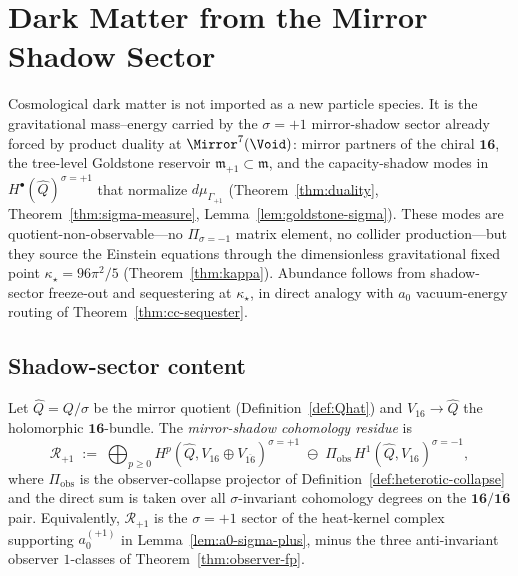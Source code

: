\section{Dark Matter from the Mirror Shadow Sector}
\label{sec:dark-sector}

Cosmological dark matter is not imported as a new particle species. It is the
gravitational mass--energy carried by the $\sigma=+1$ mirror-shadow sector
already forced by product duality at $\Mirror^7(\Void)$: mirror partners of the
chiral $\mathbf{16}$, the tree-level Goldstone reservoir
$\mathfrak{m}_{+1}\subset\mathfrak{m}$, and the capacity-shadow modes in
$H^\bullet(\hat Q)^{\sigma=+1}$ that normalize $d\mu_{\Gamma_{+1}}$
(Theorem~\ref{thm:duality}, Theorem~\ref{thm:sigma-measure},
Lemma~\ref{lem:goldstone-sigma}). These modes are quotient-non-observable---no
$\Pi_{\sigma=-1}$ matrix element, no collider production---but they source the
Einstein equations through the dimensionless gravitational fixed point
$\kappa_\star=96\pi^2/5$ (Theorem~\ref{thm:kappa}). Abundance follows from
shadow-sector freeze-out and sequestering at $\kappa_\star$, in direct analogy
with $a_0$ vacuum-energy routing of Theorem~\ref{thm:cc-sequester}.

\subsection{Shadow-sector content}
\label{sec:dark-sector:content}

\begin{definition}[$\sigma=+1$ cohomology residue]\label{def:dm-residue}
Let $\hat Q=Q/\sigma$ be the mirror quotient
(Definition~\ref{def:Qhat}) and $V_{16}\to\hat Q$ the holomorphic
$\mathbf{16}$-bundle. The \emph{mirror-shadow cohomology residue} is
\begin{equation}\label{eq:dm-residue}
  \mathcal{R}_{+1}
  \;:=\;
  \bigoplus_{p\geq 0}
  H^p(\hat Q, V_{16}\oplus V_{\overline{16}})^{\sigma=+1}
  \;\ominus\;
  \Pi_{\mathrm{obs}}\,H^1(\hat Q,V_{16})^{\sigma=-1},
\end{equation}
where $\Pi_{\mathrm{obs}}$ is the observer-collapse projector of
Definition~\ref{def:heterotic-collapse} and the direct sum is taken over all
$\sigma$-invariant cohomology degrees on the $\mathbf{16}/\overline{\mathbf{16}}$
pair. Equivalently, $\mathcal{R}_{+1}$ is the $\sigma=+1$ sector of the
heat-kernel complex supporting $a_0^{(+1)}$ in
Lemma~\ref{lem:a0-sigma-plus}, minus the three anti-invariant observer
$1$-classes of Theorem~\ref{thm:observer-fp}.
\end{definition}

